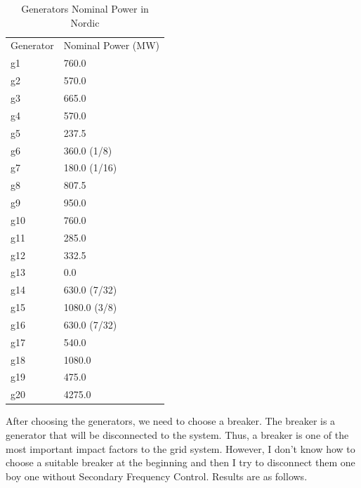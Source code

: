 \documentclass{report}
\begin{document}
\begin{table}[htbp]
\centering
\begin{tabular}{ll}
Generator & Nominal Power (MW) \\
g1        & 760.0              \\
g2        & 570.0              \\
g3        & 665.0              \\
g4        & 570.0              \\
g5        & 237.5              \\
g6        & 360.0 (1/8)        \\
g7        & 180.0 (1/16)       \\
g8        & 807.5              \\
g9        & 950.0              \\
g10       & 760.0              \\
g11       & 285.0              \\
g12       & 332.5              \\
g13       & 0.0                \\
g14       & 630.0 (7/32)       \\
g15       & 1080.0 (3/8)       \\
g16       & 630.0 (7/32)       \\
g17       & 540.0              \\
g18       & 1080.0             \\
g19       & 475.0              \\
g20       & 4275.0             

\end{tabular}
\label{nominalPower}
\caption{\label{tab:table-name}Generators Nominal Power in Nordic}
\end{table}

After choosing the generators, we need to choose a breaker. The breaker is a generator that will be disconnected to the system. Thus, a breaker is one of the most important impact factors to the grid system. However, I don’t know how to choose a suitable breaker at the beginning and then I try to disconnect them one boy one without Secondary Frequency Control. Results are as follows.\\
\end{document}
